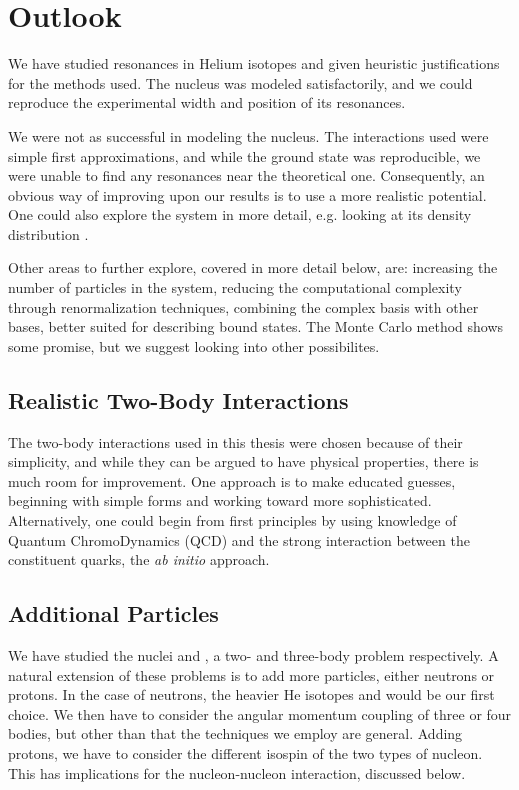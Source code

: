 \documentclass[../main/report.tex]{subfiles}
\begin{document}
\chapter{Outlook}
\label{cha:outlook}


We have studied resonances in Helium isotopes and given heuristic justifications for the methods used. The  nucleus was modeled satisfactorily, and we could reproduce the experimental width and position of its resonances. 

We were not as successful in modeling the  nucleus. The interactions used were simple first approximations, and while the ground state was reproducible, we were unable to find any resonances near the theoretical one. Consequently, an obvious way of improving upon our results is to use a more realistic potential. One could also explore the  system in more detail, e.g. looking at its density distribution \cite{radii}.

Other areas to further explore, covered in more detail below, are: increasing the number of particles in the system, reducing the computational complexity through renormalization techniques, combining the complex basis with other bases, better suited for describing bound states.
The Monte Carlo method shows some promise, but we suggest looking into other possibilites.

\section{Realistic Two-Body Interactions}
The two-body interactions used in this thesis were chosen because of their simplicity, and while they can be argued to have physical properties, there is much room for improvement. 
One approach is to make educated guesses, beginning with simple forms and working toward more sophisticated. 
Alternatively, one could begin from first principles by using knowledge of Quantum ChromoDynamics (QCD) and the strong interaction between the constituent quarks, the \emph{ab initio} approach.

\section{Additional Particles}

We have studied the nuclei  and , a two- and three-body problem respectively. 
A natural extension of these problems is to add more particles, either neutrons or protons.
In the case of neutrons, the heavier He isotopes  and  would be our first choice.
We then have to consider the angular momentum coupling of three or four bodies, but other than that the techniques we employ are general.
Adding protons, we have to consider the different isospin of the two types of nucleon.
This has implications for the nucleon-nucleon interaction, discussed below.
\end{document}
